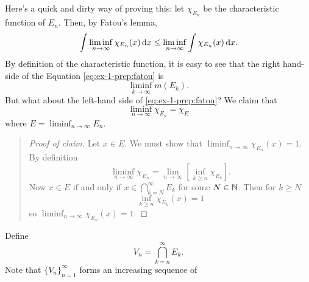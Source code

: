 \begin{solution}
  Here's a quick and dirty way of proving this: let $\chi_{E_n}$ be the
  characteristic function of $E_n$. Then, by Fatou's lemma,
  \begin{equation}
    \label{eq:ex-1-prep:fatou}
    \int\liminf_{n\to\infty}\chi_{E_n}(x)\mathop{}\!\mathrm{d} x
    \leq\liminf_{n\to\infty}\int\chi_{E_n}(x)\mathop{}\!\mathrm{d} x.
  \end{equation}
  By definition of the characteristic function, it is easy to see that the
  right hand-side of the Equation \eqref{eq:ex-1-prep:fatou} is
  \[
    \liminf_{k\to\infty}m(E_k).
  \]
  But what about the left-hand side of \eqref{eq:ex-1-prep:fatou}? We claim
  that
  \[
    \liminf_{n\to\infty}\chi_{E_n}=\chi_{E}
  \]
  where $E=\liminf_{n\to\infty} E_n$.
  \begin{quote}
    \begin{proof}[Proof of claim]
      Let $x\in E$. We must show that
      $\liminf_{n\to\infty}\chi_{E_n}(x)=1$. By definition
      \[
        \liminf_{n\to\infty}\chi_{E_n}=%
        \lim_{n\to\infty}\left[\inf_{k\geq n}\chi_{E_k}\right].
      \]
      Now $x\in E$ if and only if $x\in \bigcap_{k=N}^\infty E_k$ for some
      $N\in\mathbb{N}$. Then for $k\geq N$
      \[
        \inf_{k\geq n}\chi_{E_k}(x)=1
      \]
      so $\liminf_{n\to\infty}\chi_{E_n}(x)=1$.
    \end{proof}
  \end{quote}

  Define
  \[
    V_n=\bigcap_{k=n}^\infty E_k.
  \]
  Note that ${\{V_n\}}_{n=1}^\infty$ forms an increasing sequence of
\end{solution}

